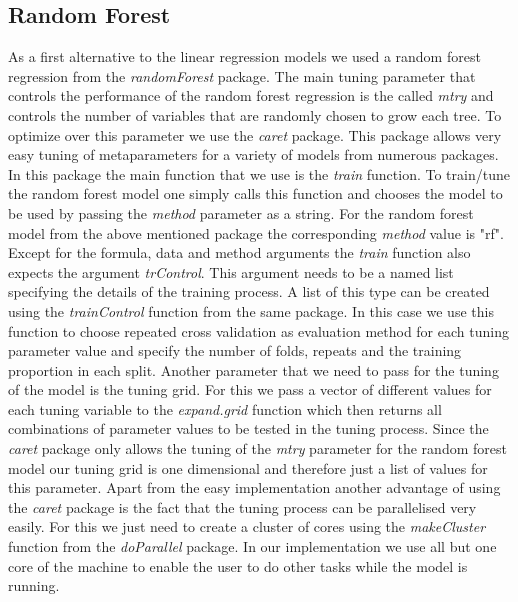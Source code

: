 \subsection{Random Forest}
As a first alternative to the linear regression models we used a random forest regression from the \textit{randomForest} package. The main tuning parameter that controls the performance of the random forest regression is the called \textit{mtry} and controls the number of variables that are randomly chosen to grow each tree. To optimize over this parameter we use the \textit{caret} package. This package allows very easy tuning of metaparameters for a variety of models from numerous packages. In this package the main function that we use is the \textit{train} function. To train/tune the random forest model one simply calls this function and chooses the model to be used by passing the \textit{method} parameter as a string. For the random forest model from the above mentioned package the corresponding \textit{method} value is "rf". Except for the formula, data and method arguments the \textit{train} function also expects the argument \textit{trControl}. This argument needs to be a named list specifying the details of the training process. A list of this type can be created using the \textit{trainControl} function from the same package. In this case we use this function to choose repeated cross validation as evaluation method for each tuning parameter value and specify the number of folds, repeats and the training proportion in each split.  Another parameter that we need to pass for the tuning of the model is the tuning grid. For this we pass a vector of different values for each tuning variable to the \textit{expand.grid} function which then returns all combinations of parameter values to be tested in the tuning process. Since the \textit{caret} package only allows the tuning of the \textit{mtry} parameter for the random forest model our tuning grid is one dimensional and therefore just a list of values for this parameter. Apart from the easy implementation another advantage of using the \textit{caret} package is the fact that the tuning process can be parallelised very easily. For this we just need to create a cluster of cores using the \textit{makeCluster} function from the \textit{doParallel} package. In our implementation we use all but one core of the machine to enable the user to do other tasks while the model is running.

